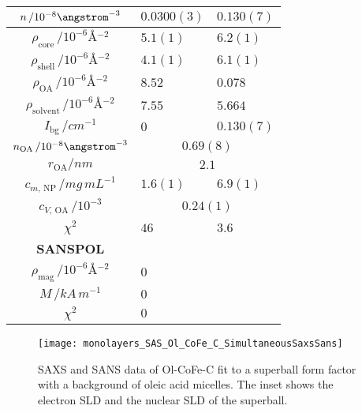 \documentclass[\main/dresen_thesis.tex]{subfiles}
\begin{document}
\begin{table}[!htbp]
\begin{tabular}{ c | l | l }
        \hline
        \rule{0pt}{2ex} $n \, / 10^{-8} \angstrom^{-3}$                              & $0.0300(3)$     & $0.130(7)$\\
        \hline
        \rule{0pt}{2ex} $\rho_\mathrm{core}    \, / \unit{10^{-6} \angstrom^{-2}}$   & $5.1(1)$ & $6.2(1)$\\
        \rule{0pt}{2ex} $\rho_\mathrm{shell}   \, / \unit{10^{-6} \angstrom^{-2}}$   & $4.1(1)$ & $6.1(1)$\\
        \rule{0pt}{2ex} $\rho_\mathrm{OA}      \, / \unit{10^{-6} \angstrom^{-2}}$   & $8.52$   & $0.078$\\
        \rule{0pt}{2ex} $\rho_\mathrm{solvent} \, / \unit{10^{-6} \angstrom^{-2}}$   & $7.55$   & $5.664$\\
        \rule{0pt}{2ex} $I_\mathrm{bg} \, / \unit{cm^{-1}}$                          & $0$      & $0.130(7)$\\
        \hline
        \rule{0pt}{2ex} $n_\mathrm{OA} \, / 10^{-8} \angstrom^{-3}$                  & \multicolumn{2}{c}{$0.69(8)$}\\
        \rule{0pt}{2ex} $r_\mathrm{OA} / \unit{nm}$                                  & \multicolumn{2}{c}{$2.1$}\\
        \hline
        \rule{0pt}{2ex} $c_{m, \, \mathrm{NP}} \, / \unit{mg\, mL^{-1}}$             & $1.6(1)$  & $6.9(1)$\\
        \rule{0pt}{2ex} $c_{V, \, \mathrm{OA}} \, / \unit{10^{-3}}$                  & \multicolumn{2}{c}{$0.24(1)$}\\
        \hline
        \rule{0pt}{2ex} $\chi^2$                                                     & $46$     & $3.6$\\
        \hline
        \textbf{SANSPOL}\\
        \hline
        \rule{0pt}{2ex} $\rho_\mathrm{mag} \, / \unit{10^{-6} \angstrom^{-2}}$       & $0$\\
        \rule{0pt}{2ex} $M \, / \unit{kA \,m^{-1}}$                                  & $0$\\
        \hline
        \rule{0pt}{2ex} $\chi^2$                                                     & $0$\\
      \end{tabular}
    \end{table}


    \begin{figure}[tb]
      \centering
      \texttt{[image: monolayers\_SAS\_Ol\_CoFe\_C\_SimultaneousSaxsSans]}
      \caption{\label{fig:monolayers:nanoparticle:sas:OlCoFeC}SAXS and SANS data of Ol-CoFe-C fit to a superball form factor with a background of oleic acid micelles. The inset shows the electron SLD and the nuclear SLD of the superball. }
    \end{figure}
\end{document}
